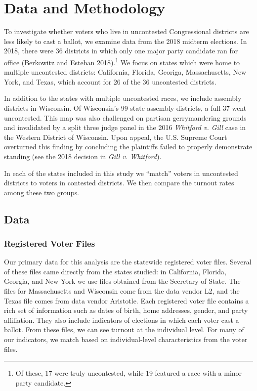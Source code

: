 \documentclass[
  12pt,
]{article}
\begin{document}
\hypertarget{data-and-methodology}{%
\section*{Data and Methodology}\label{data-and-methodology}}

To investigate whether voters who live in uncontested Congressional districts are less likely to cast a ballot, we examine data from the 2018 midterm elections. In 2018, there were 36 districts in which only one major party candidate ran for office (Berkowitz and Esteban \protect\hyperlink{ref-wapo}{2018}).\footnote{Of these, 17 were truly uncontested, while 19 featured a race with a minor party candidate.} We focus on states which were home to multiple uncontested districts: California, Florida, Georiga, Massachusetts, New York, and Texas, which account for 26 of the 36 uncontested districts.

In addition to the states with multiple uncontested races, we include assembly districts in Wisconsin. Of Wisconsin's 99 state assembly districts, a full 37 went uncontested. This map was also challenged on partisan gerrymandering grounds and invalidated by a split three judge panel in the 2016 \textit{Whitford v. Gill} case in the Western District of Wisconsin. Upon appeal, the U.S. Supreme Court overturned this finding by concluding the plaintiffs failed to properly demonstrate standing (see the 2018 decision in \textit{Gill v. Whitford}).

In each of the states included in this study we ``match'' voters in uncontested districts to voters in contested districts. We then compare the turnout rates among these two groups.

\hypertarget{data}{%
\subsection*{Data}\label{data}}

\hypertarget{registered-voter-files}{%
\subsubsection*{Registered Voter Files}\label{registered-voter-files}}

Our primary data for this analysis are the statewide registered voter files. Several of these files came directly from the states studied: in California, Florida, Georgia, and New York we use files obtained from the Secretary of State. The files for Massachusetts and Wisconsin come from the data vendor L2, and the Texas file comes from data vendor Aristotle. Each registered voter file contains a rich set of information such as dates of birth, home addresses, gender, and party affiliation. They also include indicators of elections in which each voter cast a ballot. From these files, we can see turnout at the individual level. For many of our indicators, we match based on individual-level characteristics from the voter files.
\end{document}
